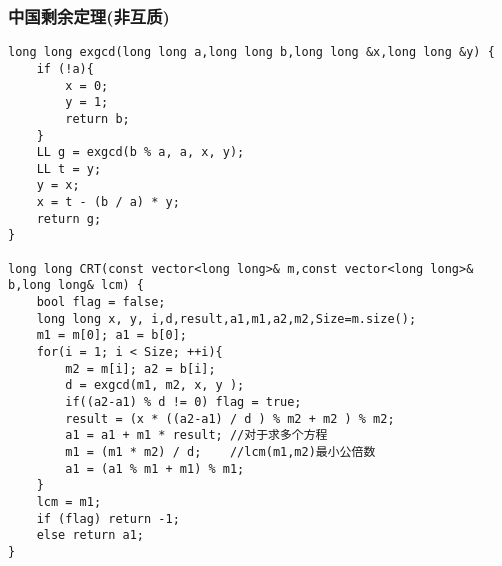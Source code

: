 \subsubsection{中国剩余定理(非互质)}
\begin{verbatim}
long long exgcd(long long a,long long b,long long &x,long long &y) {
    if (!a){
        x = 0;
        y = 1;
        return b;
    }
    LL g = exgcd(b % a, a, x, y);
    LL t = y;
    y = x;
    x = t - (b / a) * y;
    return g;
}

long long CRT(const vector<long long>& m,const vector<long long>& b,long long& lcm) {
    bool flag = false;
    long long x, y, i,d,result,a1,m1,a2,m2,Size=m.size();
    m1 = m[0]; a1 = b[0];
    for(i = 1; i < Size; ++i){
        m2 = m[i]; a2 = b[i];
        d = exgcd(m1, m2, x, y );
        if((a2-a1) % d != 0) flag = true;
        result = (x * ((a2-a1) / d ) % m2 + m2 ) % m2;
        a1 = a1 + m1 * result; //对于求多个方程
        m1 = (m1 * m2) / d;    //lcm(m1,m2)最小公倍数
        a1 = (a1 % m1 + m1) % m1;
    }
    lcm = m1;
    if (flag) return -1;
    else return a1;
}
\end{verbatim}
